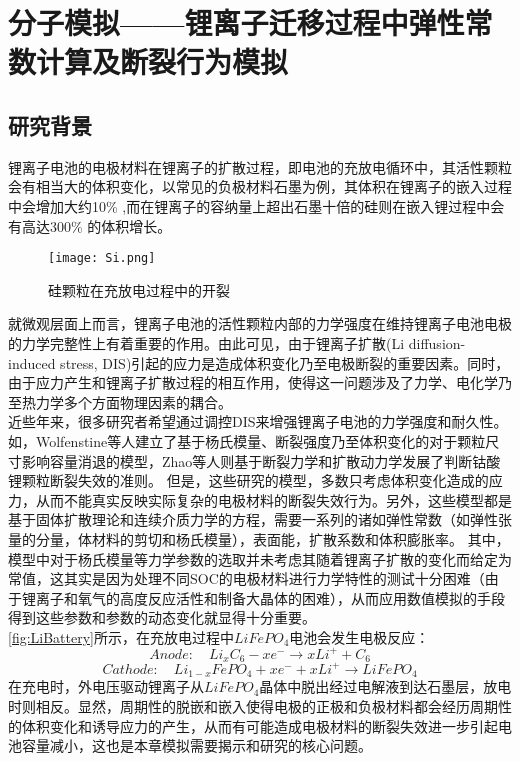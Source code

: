\chapter{分子模拟——锂离子迁移过程中弹性常数计算及断裂行为模拟}
\section{研究背景}
锂离子电池的电极材料在锂离子的扩散过程，即电池的充放电循环中，其活性颗粒会有相当大的体积变化，以常见的负极材料石墨为例，其体积在锂离子的嵌入过程中会增加大约10\% \cite{Dahn1991Phase},而在锂离子的容纳量上超出石墨十倍的硅则在嵌入锂过程中会有高达300\% 的体积增长\cite{Beaulieu2003The}。
\begin{figure}
\centering   
\texttt{[image: Si.png]}
\caption{硅颗粒在充放电过程中的开裂} 
\label{fig:Si}
\end{figure}
就微观层面上而言，锂离子电池的活性颗粒内部的力学强度在维持锂离子电池电极的力学完整性上有着重要的作用\cite{Lee2014Molecular}。由此可见，由于锂离子扩散(Li diffusion-induced stress, DIS)引起的应力是造成体积变化乃至电极断裂的重要因素。同时，由于应力产生和锂离子扩散过程的相互作用，使得这一问题涉及了力学、电化学乃至热力学多个方面物理因素的耦合。\\
\indent 近些年来，很多研究者希望通过调控DIS来增强锂离子电池的力学强度和耐久性\cite{Christensen2005A,Christensen2006Stress,Zhang2007Numerical,Verbrugge2009Stress,Cheng2008The,Zhang2008Intercalation}。如，Wolfenstine等人建立了基于杨氏模量、断裂强度乃至体积变化的对于颗粒尺寸影响容量消退的模型\cite{Woodford2010}，Zhao等人则基于断裂力学和扩散动力学发展了判断钴酸锂颗粒断裂失效的准则\cite{Zhao2010Fracture}。 但是，这些研究的模型，多数只考虑体积变化造成的应力，从而不能真实反映实际复杂的电极材料的断裂失效行为。另外，这些模型都是基于固体扩散理论和连续介质力学的方程，需要一系列的诸如弹性常数（如弹性张量的分量，体材料的剪切和杨氏模量），表面能，扩散系数和体积膨胀率。 其中，模型中对于杨氏模量等力学参数的选取并未考虑其随着锂离子扩散的变化而给定为常值，这其实是因为处理不同SOC的电极材料进行力学特性的测试十分困难（由于锂离子和氧气的高度反应活性和制备大晶体的困难），从而应用数值模拟的手段得到这些参数和参数的动态变化就显得十分重要。\\
\ref{fig:LiBattery}所示，在充放电过程中$LiFePO_4$电池会发生电极反应：
\begin{equation}
\label{eq:anode}
Anode : \quad Li_xC_6 -x e^{-} \to x Li^{+} +C_6
\end{equation}
\begin{equation}
\label{eq:cathode}
Cathode : \quad Li_{1-x}FePO_4 +x e^{-} + x Li^{+} \to LiFePO_4
\end{equation}
\indent 在充电时，外电压驱动锂离子从$LiFePO_4$晶体中脱出经过电解液到达石墨层，放电时则相反。显然，周期性的脱嵌和嵌入使得电极的正极和负极材料都会经历周期性的体积变化和诱导应力的产生，从而有可能造成电极材料的断裂失效进一步引起电池容量减小，这也是本章模拟需要揭示和研究的核心问题。

